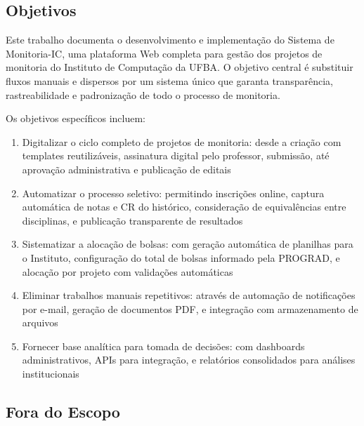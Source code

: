 \documentclass[portuguese]{sbc2025}%
\begin{document}
\subsection{Objetivos}

Este trabalho documenta o desenvolvimento e implementação do Sistema de Monitoria-IC, uma plataforma Web completa para gestão dos projetos de monitoria do Instituto de Computação da UFBA. O objetivo central é substituir fluxos manuais e dispersos por um sistema único que garanta transparência, rastreabilidade e padronização de todo o processo de monitoria.

Os objetivos específicos incluem:

\begin{enumerate}
  \item Digitalizar o ciclo completo de projetos de monitoria: desde a criação com templates reutilizáveis, assinatura digital pelo professor, submissão, até aprovação administrativa e publicação de editais

  \item Automatizar o processo seletivo: permitindo inscrições online, captura automática de notas e CR do histórico, consideração de equivalências entre disciplinas, e publicação transparente de resultados

  \item Sistematizar a alocação de bolsas: com geração automática de planilhas para o Instituto, configuração do total de bolsas informado pela PROGRAD, e alocação por projeto com validações automáticas

  \item Eliminar trabalhos manuais repetitivos: através de automação de notificações por e-mail, geração de documentos PDF, e integração com armazenamento de arquivos

  \item Fornecer base analítica para tomada de decisões: com dashboards administrativos, APIs para integração, e relatórios consolidados para análises institucionais
\end{enumerate}

\subsection{Fora do Escopo}
\end{document}
